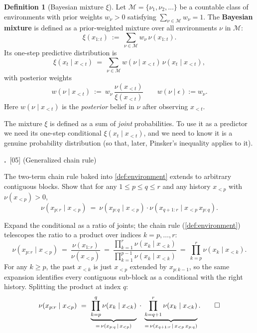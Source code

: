 \documentclass[fontsize=11pt, parskip=half]{scrartcl}
\theoremstyle{definition}
\newtheorem{definition}[theorem]{Definition}
\newenvironment{solution}{%
    \begin{tcolorbox}[colback=black!5!white, colframe=black!50!white,
      title={\textbf{Solution}}, fonttitle=\normalfont, breakable]
  }{\end{tcolorbox}}
\newenvironment{solution}{\expandafter\comment}{\expandafter\endcomment}
\newcommand{\mysubsection}[2]{\par\medskip\noindent\refstepcounter{subsection}\textbf{\thesubsection.}~#2\par\smallskip}
\newcommand{\Mc}{\mathcal{M}}
\begin{document}
\begin{definition}[Bayesian mixture $\xi$]\label{def:mixture}
Let $\Mc = \{\nu_1, \nu_2, \dots\}$ be a countable class of environments with prior weights $w_\nu > 0$ satisfying $\sum_{\nu \in \Mc} w_\nu = 1$. The \textbf{Bayesian mixture} is defined as a prior-weighted mixture over all environments $\nu$ in $\Mc$:
\begin{equation}\label{eq:mixture_expression}
  \xi(x_{1:t}) ~:=~ \sum_{\nu \in \Mc} w_\nu\, \nu(x_{1:t}).
\end{equation}
Its one-step predictive distribution is
\[
  \xi(x_t \mid x_{<t}) ~=~ \sum_{\nu \in \Mc} w(\nu \mid x_{<t})\, \nu(x_t \mid x_{<t}),
\]
with posterior weights 
\[
w(\nu \mid x_{<t}) ~:=~ w_\nu\, \frac{\nu(x_{<t})}{\xi(x_{<t})}
\qquad w(\nu \mid \epsilon) := w_\nu.
\]
Here $w(\nu \mid x_{<t})$ is the \emph{posterior} belief in $\nu$ after observing $x_{<t}$.
\end{definition}

The mixture $\xi$ is defined as a sum of \emph{joint} probabilities. To use it as a predictor we need its one-step conditional $\xi(x_t \mid x_{<t})$, and we need to know it is a genuine probability distribution (so that, later, Pinsker's inequality applies to it).

\mysubsection{1}{[05] (Generalized chain rule)\label{prob:chain_rule_gen_ex}}

The two-term chain rule baked into \cref{def:environment} extends to arbitrary contiguous blocks. Show that for any $1 \leq p \leq q \leq r$ and any history $x_{<p}$ with $\nu(x_{<p}) > 0$,
\[
  \nu(x_{p:r} \mid x_{<p}) ~=~ \nu(x_{p:q} \mid x_{<p}) \cdot \nu(x_{q+1:r} \mid x_{<p}\, x_{p:q}).
\]

\begin{solution}
Expand the conditional as a ratio of joints; the chain rule (\cref{def:environment}) telescopes the ratio to a product over indices $k = p, \ldots, r$:
\[
  \nu(x_{p:r} \mid x_{<p})
  ~=~ \frac{\nu(x_{1:r})}{\nu(x_{<p})}
  ~=~ \frac{\prod_{k=1}^{r} \nu(x_k \mid x_{<k})}{\prod_{k=1}^{p-1} \nu(x_k \mid x_{<k})}
  ~=~ \prod_{k=p}^{r} \nu(x_k \mid x_{<k}).
\]
For any $k \geq p$, the past $x_{<k}$ is just $x_{<p}$ extended by $x_{p:k-1}$, so the same expansion identifies every contiguous sub-block as a conditional with the right history. Splitting the product at index $q$:
\[
  \nu(x_{p:r} \mid x_{<p})
  ~=~ \underbrace{\prod_{k=p}^{q} \nu(x_k \mid x_{<k})}_{=\,\nu(x_{p:q}\,\mid\,x_{<p})}
  \;\cdot\; \underbrace{\prod_{k=q+1}^{r} \nu(x_k \mid x_{<k})}_{=\,\nu(x_{q+1:r}\,\mid\,x_{<p}\, x_{p:q})}. \qedhere
\]
\end{solution}
\end{document}
